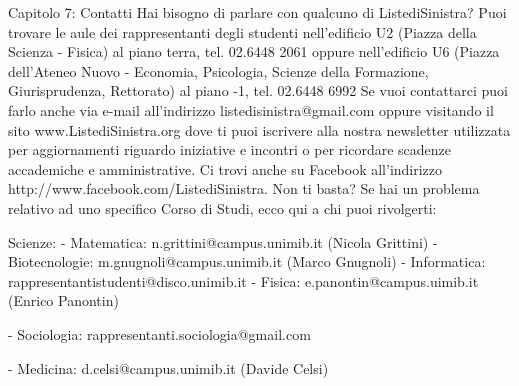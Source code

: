 Capitolo 7: Contatti
Hai bisogno di parlare con qualcuno di ListediSinistra? Puoi trovare le aule dei rappresentanti degli studenti  nell'edificio U2 (Piazza della Scienza - Fisica) al piano terra, tel. 02.6448 2061 oppure nell'edificio U6 (Piazza dell'Ateneo Nuovo - Economia, Psicologia, Scienze della Formazione, Giurisprudenza, Rettorato) al piano -1, tel. 02.6448 6992
Se vuoi contattarci puoi farlo anche via e-mail all’indirizzo listedisinistra@gmail.com oppure visitando il sito www.ListediSinistra.org dove ti puoi iscrivere alla nostra newsletter utilizzata per aggiornamenti riguardo iniziative e incontri o per ricordare scadenze accademiche e amministrative. Ci trovi anche su Facebook all'indirizzo http://www.facebook.com/ListediSinistra.
Non ti basta? Se hai un problema relativo ad uno specifico Corso di Studi, ecco qui a chi puoi rivolgerti:

Scienze:
   - Matematica: n.grittini@campus.unimib.it (Nicola Grittini)
   - Biotecnologie: m.gnugnoli@campus.unimib.it (Marco Gnugnoli)
   - Informatica: rappresentantistudenti@disco.unimib.it
   - Fisica: e.panontin@campus.uimib.it (Enrico Panontin)
   
   - Sociologia: rappresentanti.sociologia@gmail.com
   
   - Medicina: d.celsi@campus.unimib.it (Davide Celsi)
   

